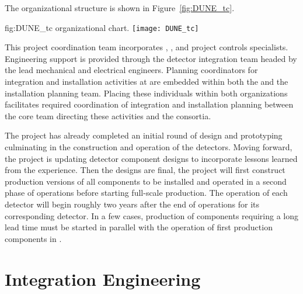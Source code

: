 The   organizational structure is shown 
in Figure~\ref{fig:DUNE_tc}.  

\begin{dunefigure}{fig:DUNE_tc}
  {  organizational chart.}
  \texttt{[image: DUNE\_tc]}
\end{dunefigure}

This project coordination team incorporates , 
, and project controls specialists.  Engineering support 
is provided through the  detector integration team 
headed by the lead  mechanical and electrical engineers.
Planning coordinators for integration and installation activities 
at  are embedded within both the  and the 
 installation planning team.  Placing 
these individuals within both organizations facilitates required 
coordination of integration and installation planning 
between the core team directing these activities and the 
 consortia. %

The  project has already completed an initial round of design 
and prototyping culminating in the construction and operation 
of the  detectors.  Moving forward, the project is 
updating detector component designs to incorporate lessons learned from 
the  experience.  Then the designs are final, the 
project will first construct production versions of all components to be installed and operated in a second phase of  
operations before starting full-scale production.  The operation 
of each  detector will begin roughly two years after
the end of operations for its corresponding  detector.
In a few cases, production of components requiring a long lead time must 
be started in parallel with the operation of first production components 
in .

\section{Integration Engineering}
\label{sec:es-coord-integ-sysengr}


